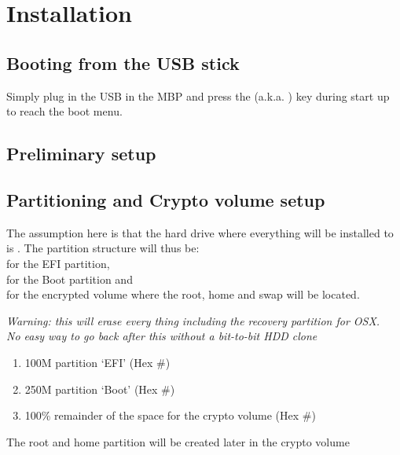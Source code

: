 \section{Installation}

\subsection{Booting from the USB stick}

Simply plug in the USB in the MBP and press the  (a.k.a. ) key during start up
to reach the boot menu.

\subsection{Preliminary setup}


\subsection{Partitioning and Crypto volume setup}

The assumption here is that the hard drive where everything will be installed to is . The partition structure will thus be: \\
 for the EFI partition,\\
 for the Boot partition and\\
 for the encrypted volume where the root, home and swap will be located.\\

\begin{blocksection}
	\textit{Warning: this will erase every thing including the recovery partition for OSX. \\
		No easy way to go back after this without a bit-to-bit HDD clone}
	\begin{enumerate}
		\item 100M partition `EFI' (Hex \#)
		\item 250M partition `Boot' (Hex \#)
		\item 100\% remainder of the space for the crypto volume (Hex \#)
	\end{enumerate}
	The root and home partition will be created later in the crypto volume
\end{blocksection}

